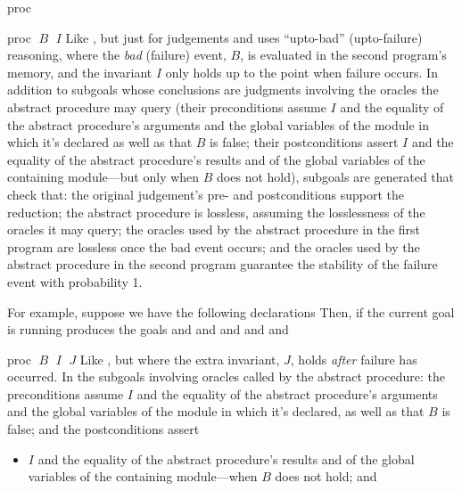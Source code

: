\begin{tactic}{proc}
  \begin{tsyntax}{proc $\;B$ $\;I$}
    Like , but just for \prhl judgements and uses
    ``upto-bad'' (upto-failure) reasoning, where the \emph{bad}
    (failure) event, $B$, is evaluated in the second program's memory,
    and the invariant $I$ only holds up to the point when failure
    occurs.  In addition to subgoals whose conclusions are \prhl
    judgments involving the oracles the abstract procedure may query
    (their preconditions assume $I$ and the equality of the abstract
    procedure's arguments and the global variables of the module in
    which it's declared as well as that $B$ is false; their
    postconditions assert $I$ and the equality of the abstract
    procedure's results and of the global variables of the containing
    module---but only when $B$ does not hold), subgoals are generated
    that check that: the original judgement's pre- and postconditions
    support the reduction; the abstract procedure is lossless,
    assuming the losslessness of the oracles it may query; the oracles
    used by the abstract procedure in the first program are lossless
    once the bad event occurs; and the oracles used by the abstract
    procedure in the second program guarantee the stability of the
    failure event with probability 1.

  \bigskip
  For example, suppose we have the following declarations
  Then, if the current goal is
  running 
  produces the goals
  and
  and
  and
  and
  and
  \end{tsyntax}

  \begin{tsyntax}{proc $\;B$ $\;I$ $\;J$}
    Like , but where the extra invariant, $J$,
    holds \emph{after} failure has occurred.  In the \prhl subgoals
    involving oracles called by the abstract procedure: the
    preconditions assume $I$ and the equality of the abstract
    procedure's arguments and the global variables of the module in
    which it's declared, as well as that $B$ is false; and the
    postconditions assert
    \begin{itemize}
    \item $I$ and the equality of the abstract procedure's results and
      of the global variables of the containing module---when $B$ does
      not hold; and


\end{itemize}
\end{tsyntax}
\end{tactic}
